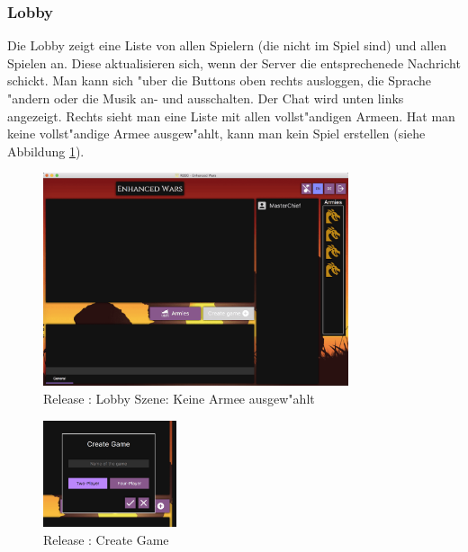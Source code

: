 \documentclass[12pt, titlepage]{scrartcl}
\newcommand{\RN}[1]{%
	\textup{\uppercase\expandafter{\romannumeral#1}}%
}
\begin{document}
            \subsubsection{Lobby} \label{LOBBY}
                Die Lobby zeigt eine Liste von allen Spielern (die nicht im Spiel sind) und allen Spielen an. Diese aktualisieren sich, wenn der Server die entsprechenede Nachricht schickt. Man kann sich "uber die Buttons oben rechts ausloggen, die Sprache "andern oder die Musik an- und ausschalten. Der Chat wird unten links angezeigt. Rechts sieht man eine Liste mit allen vollst"andigen Armeen. Hat man keine vollst"andige Armee ausgew"ahlt, kann man kein Spiel erstellen (siehe Abbildung \ref{Lobby_No_Army_Selected}). \\
                \begin{figure}[H] 
    				\centering
    				\includegraphics[width=0.8\textwidth]{images/old_state/lobby/NoArmySelected.png}
    				\caption{Release \RN{2}: Lobby Szene: Keine Armee ausgew"ahlt}
    				\label{Lobby_No_Army_Selected}
			    \end{figure}
			    \begin{figure}
                    \begin{center}
                        \includegraphics[width=0.35\textwidth]{images/old_state/lobby/CreateGame.png}
                    \end{center}
                    \caption{Release \RN{2}: Create Game}
                    \label{Create_Game}
                \end{figure}
\end{document}
